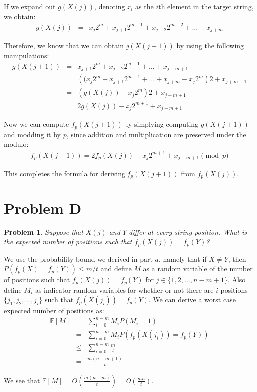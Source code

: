 \documentclass[psamsfonts]{amsart}
\newtheorem{prob}{Problem}[section]
\newenvironment{sol}{{\bfseries Solution}}{\qedsymbol}
\theoremstyle{definition}
\theoremstyle{remark}
\numberwithin{equation}{section}
\begin{document}
\begin{sol}
If we expand out $g(X(j))$, denoting $x_i$ as the $i$th element in the target string, we obtain:
\begin{eqnarray}
g(X(j)) &=& x_j 2^m + x_{j+1} 2^{m-1} + x_{j+2} 2^{m-2} + \ldots + x_{j+m}
\end{eqnarray}

Therefore, we know that we can obtain $g(X(j+1))$ by using the following manipulations:
\begin{eqnarray}
g(X(j+1)) &=& x_{j+1} 2^m + x_{j+2} 2^{m-1} + \ldots + x_{j+m+1} \\
&=& \left( (x_j 2^m + x_{j+1} 2^{m-1} + \ldots + x_{j+m} - x_{j} 2^m \right)2 + x_{j+m+1} \\
&=& \left( g(X(j)) - x_j 2^{m} \right) 2 + x_{j + m + 1} \\
&=& 2 g(X(j)) - x_j 2^{m+1} + x_{j+m+1}
\end{eqnarray}

Now we can compute $f_p(X(j+1))$ by simplying computing $g(X(j+1))$ and modding it by $p$, since addition and multiplication are preserved under the modulo:
\begin{eqnarray}
f_p(X(j+1)) = 2 f_p(X(j)) - x_j 2^{m+1} + x_{j+m + 1} \pmod {p}
\end{eqnarray}

This completes the formula for deriving $f_p(X(j+1))$ from $f_p(X(j))$. 
\end{sol}

\section{Problem D}

\begin{prob}
Suppose that $X(j)$ and $Y$ differ at every string position. What is the expected number of positions such that $f_p(X(j)) = f_p(Y)$?
\end{prob}

\begin{sol}
We use the probability bound we derived in part $a$, namely that if $X \neq Y$, then $P(f_p(X) = f_p(Y)) \leq m/t$ and define $M$ as a random variable of the number of positions such that $f_p(X(j)) = f_p(Y)$ for $j \in \{1,2,\ldots,n-m+1\}$. Also define $M_i$ as indicator random variables for whether or not there are $i$ positions $\{j_1, j_2, \ldots, j_i\}$ such that $f_p(X(j_i)) = f_p(Y)$. We can derive a worst case expected number of positions as:
\begin{eqnarray}
\mathbb{E}[M] &=& \sum_{i=0}^{n-m} M_i P(M_i = 1) \\
&=& \sum_{i=0}^{n-m} M_i P(f_p(X(j_i)) = f_p(Y)) \\
&\leq& \sum_{i=0}^{n-m} \frac{m}{t} \\
&=& \frac{m(n-m + 1)}{t}
\end{eqnarray} 

We see that $\mathbb{E}[M] = O \left(\frac{m(n-m)}{t} \right) = O \left( \frac{mn}{t} \right) $. 
\end{sol}
\end{document}
